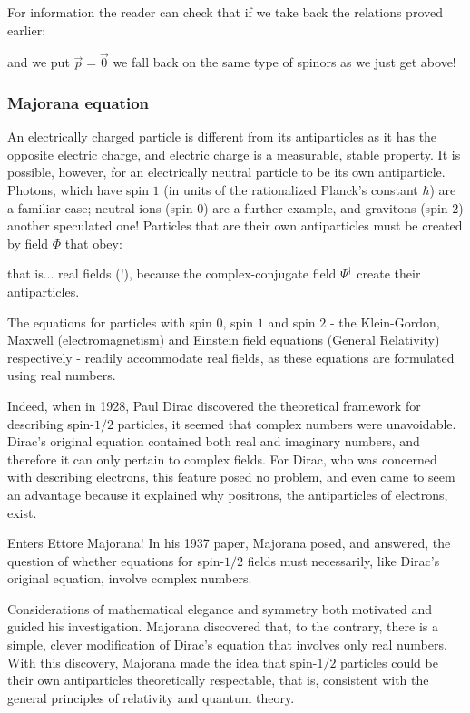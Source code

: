 	For information the reader can check that if we take back the relations proved earlier:
	
	
	
	
	and we put $\vec{p}=\vec{0}$ we fall back on the same type of spinors as we just get above!
	
	\subsubsection{Majorana equation}
	An electrically charged particle is different from its antiparticles as it has the opposite electric charge, and electric charge is a measurable, stable property. It is possible, however, for an electrically neutral particle to be its own antiparticle. Photons, which have spin $1$ (in units of the rationalized Planck's constant $\hbar$) are a familiar case; neutral ions (spin $0$) are a further example, and gravitons (spin $2$) another speculated one! Particles that are their own antiparticles must be created by field $\Phi$ that obey:
	
	that is... real fields (!), because the complex-conjugate field $\Psi^\dagger$ create their antiparticles. 
	
	The equations for particles with spin $0$, spin $1$ and spin $2$ - the Klein-Gordon, Maxwell (electromagnetism) and Einstein field equations (General Relativity) respectively - readily accommodate real fields, as these equations are formulated using real numbers.
	
	Indeed, when in 1928, Paul Dirac discovered the theoretical framework for describing spin-$1/2$ particles, it seemed that complex numbers were unavoidable. Dirac's original equation contained both real and imaginary numbers, and therefore it can only pertain to complex fields. For Dirac, who was concerned with describing  electrons, this feature posed no problem, and even came to seem an advantage because it explained why positrons, the antiparticles of electrons, exist.
	
	Enters Ettore Majorana! In his 1937 paper, Majorana posed, and answered, the question of whether equations for spin-$1/2$ fields must necessarily, like Dirac's original equation, involve complex numbers.
	
	Considerations of mathematical elegance and symmetry both motivated and guided his investigation. Majorana discovered that, to the contrary, there is a simple, clever modification of Dirac's equation that involves only real numbers. With this discovery, Majorana made the idea that spin-$1/2$ particles could be their own antiparticles theoretically respectable, that is, consistent with the general principles of relativity and quantum theory.
	
